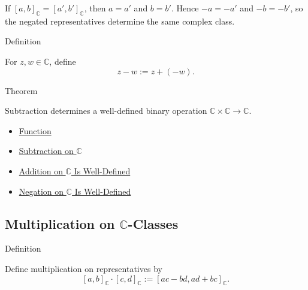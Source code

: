 \begin{remark*}
If \([a,b]_{\mathbb{C}}=[a',b']_{\mathbb{C}}\), then \(a=a'\) and
\(b=b'\). Hence \(-a=-a'\) and \(-b=-b'\), so the negated representatives
determine the same complex class.
\end{remark*}

\begin{definitionbox}{Definition}
\begin{definition}
\label{def:subtraction-on-c}
For $z,w\in\mathbb{C}$, define
\[
z-w:=z+(-w).
\]
\end{definition}
\end{definitionbox}

\begin{theorembox}{Theorem}
\begin{theorem}
\label{thm:subtraction-on-c-well-defined}
Subtraction determines a well-defined binary operation
\(\mathbb{C}\times\mathbb{C}\to\mathbb{C}\).
\end{theorem}
\end{theorembox}

\begin{dependencies}
\begin{itemize}
  \item \hyperref[def:function]{Function}
  \item \hyperref[def:subtraction-on-c]{Subtraction on $\mathbb{C}$}
  \item \hyperref[thm:addition-on-c-well-defined]{Addition on $\mathbb{C}$ Is Well-Defined}
  \item \hyperref[thm:negation-on-c-well-defined]{Negation on $\mathbb{C}$ Is Well-Defined}
\end{itemize}
\end{dependencies}

\subsection*{\texorpdfstring{Multiplication on $\mathbb{C}$-Classes}{Multiplication on C-Classes}}

\begin{definitionbox}{Definition}
\begin{definition}
\label{def:multiplication-on-c-classes}
Define multiplication on representatives by
\[
[a,b]_{\mathbb{C}}\cdot[c,d]_{\mathbb{C}}
:=[ac-bd,ad+bc]_{\mathbb{C}}.
\]
\end{definition}
\end{definitionbox}


